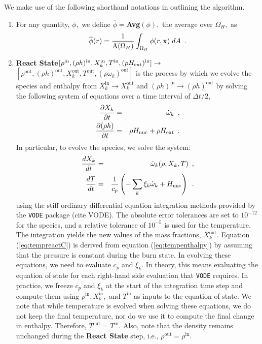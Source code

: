 \documentclass[11pt]{article}
\newcommand{\Hext}{{H_{\rm ext}}}
\newcommand{\Hnuc}{{H_{\rm nuc}}}
\newcommand{\inp}{\mathrm{in}}
\newcommand{\outp}{\mathrm{out}}
\newcommand{\omegadot}{\dot{\omega}}
\begin{document}
We make use of the following shorthand notations in outlining the algorithm.
\begin{enumerate}

\item For any quantity, $\phi,$ we define $\overline{\phi} = ${\bf Avg}$(\phi),$ 
the average over $\Omega_H,$ as
\begin{equation}
\overline{\phi}(r) = \frac{1}{\mathrm{A}(\Omega_H)}\int_{\Omega_H} \phi(r,{\bf x}) \; dA \enskip .
\end{equation}

\item {\bf React State}$[\rho^{\inp},(\rho h)^{\inp},X_k^{\inp},T^{\inp}, (\rho\Hext)^{\inp}]\rightarrow$
$[\rho^{\outp}, (\rho h)^{\outp}, X_k^{\outp}, T^{\outp}, (\rho \omegadot_k)^{\outp}]$ \newline
is the process by which we evolve the species and enthalpy from $X_k^{\inp} \rightarrow X_k^{\outp}$ 
and $(\rho h)^{\inp} \rightarrow (\rho h)^{\outp}$ by solving the following system of equations 
over a time interval of  $\Delta t/2$,
\begin{eqnarray}
\frac{\partial X_k}{\partial t} &=& \omegadot_k\enskip,\\
\frac{\partial (\rho h)}{\partial t} &=& \rho \Hnuc + \rho \Hext\enskip .
\end{eqnarray}
  In particular, to evolve the species, we solve the system:
\begin{eqnarray}
\frac{dX_k}{dt} &=& \omegadot_k(\rho,X_k,T)\enskip, \\
\frac{dT}{dt} &=&\frac{1}{c_p} \left ( -\sum_k \xi_k  \omegadot_k  + \Hnuc \right )\enskip.
\end{eqnarray}
using the stiff ordinary differential equation
 integration methods provided by the {\tt VODE} package (cite VODE).
The absolute error tolerances are set to $10^{-12}$ for the species,
 and a relative tolerance of $10^{-5}$ is used for the temperature.  
The integration yields the new values of the mass fractions, $X_k^{\outp}$.  
Equation (\ref{eq:tempreactC}) is derived from equation (\ref{eq:tempenthalpy}) by assuming that the pressure is constant during the burn state.  
In evolving these equations, we need to evaluate $c_p$ and $\xi_k$.  
In theory, this means evaluating the equation of state for each right-hand side evaluation that {\tt VODE} requires.  
In practice, we freeze $c_p$ and $\xi_k$ at the start of the integration time step and compute them using 
$\rho^{\inp}, X_k^{\inp},$ and $T^{\inp}$ as inputs to the equation of state.  
We note that while temperature is evolved when solving these equations, we do not keep the final temperature, 
nor do we use it to compute the final change in enthalpy.  
Therefore, $T^{\outp} = T^{\inp}$.  Also, note that the density remains unchanged during 
the {\bf React State} step, i.e., $\rho^{\outp} = \rho^{\inp}$.


\end{enumerate}
\end{document}
